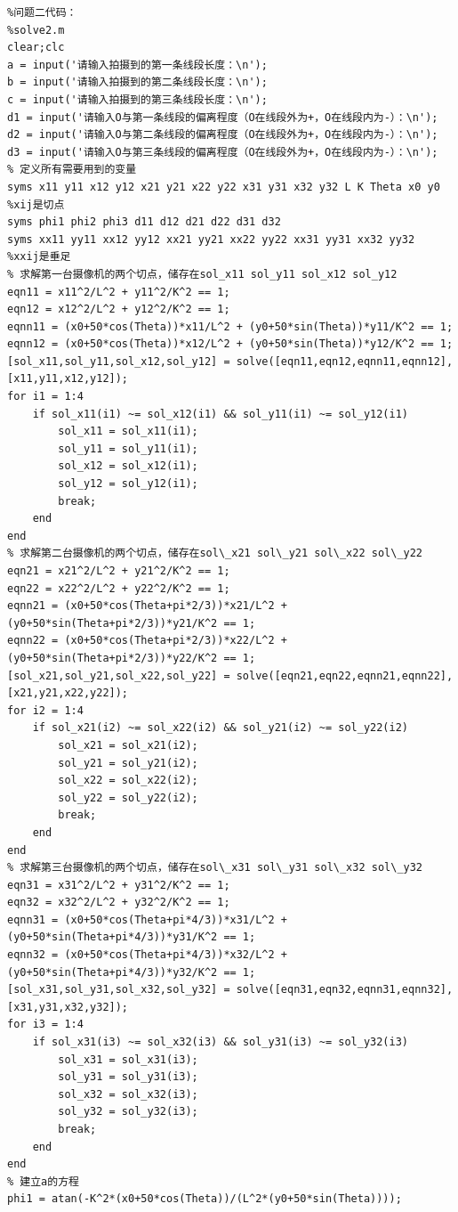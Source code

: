 \documentclass[a4paper,10.5pt]{ctexart}
\begin{document}
\begin{lstlisting}
%问题二代码：
%solve2.m
clear;clc
a = input('请输入拍摄到的第一条线段长度：\n');
b = input('请输入拍摄到的第二条线段长度：\n');
c = input('请输入拍摄到的第三条线段长度：\n');
d1 = input('请输入O与第一条线段的偏离程度（O在线段外为+，O在线段内为-）：\n');
d2 = input('请输入O与第二条线段的偏离程度（O在线段外为+，O在线段内为-）：\n');
d3 = input('请输入O与第三条线段的偏离程度（O在线段外为+，O在线段内为-）：\n');
% 定义所有需要用到的变量
syms x11 y11 x12 y12 x21 y21 x22 y22 x31 y31 x32 y32 L K Theta x0 y0 
%xij是切点
syms phi1 phi2 phi3 d11 d12 d21 d22 d31 d32
syms xx11 yy11 xx12 yy12 xx21 yy21 xx22 yy22 xx31 yy31 xx32 yy32 
%xxij是垂足
% 求解第一台摄像机的两个切点，储存在sol_x11 sol_y11 sol_x12 sol_y12
eqn11 = x11^2/L^2 + y11^2/K^2 == 1;
eqn12 = x12^2/L^2 + y12^2/K^2 == 1;
eqnn11 = (x0+50*cos(Theta))*x11/L^2 + (y0+50*sin(Theta))*y11/K^2 == 1;
eqnn12 = (x0+50*cos(Theta))*x12/L^2 + (y0+50*sin(Theta))*y12/K^2 == 1;
[sol_x11,sol_y11,sol_x12,sol_y12] = solve([eqn11,eqn12,eqnn11,eqnn12],[x11,y11,x12,y12]);
for i1 = 1:4
    if sol_x11(i1) ~= sol_x12(i1) && sol_y11(i1) ~= sol_y12(i1)
        sol_x11 = sol_x11(i1);
        sol_y11 = sol_y11(i1);
        sol_x12 = sol_x12(i1);
        sol_y12 = sol_y12(i1);
        break;
    end
end
% 求解第二台摄像机的两个切点，储存在sol\_x21 sol\_y21 sol\_x22 sol\_y22
eqn21 = x21^2/L^2 + y21^2/K^2 == 1;
eqn22 = x22^2/L^2 + y22^2/K^2 == 1;
eqnn21 = (x0+50*cos(Theta+pi*2/3))*x21/L^2 + (y0+50*sin(Theta+pi*2/3))*y21/K^2 == 1;
eqnn22 = (x0+50*cos(Theta+pi*2/3))*x22/L^2 + (y0+50*sin(Theta+pi*2/3))*y22/K^2 == 1;
[sol_x21,sol_y21,sol_x22,sol_y22] = solve([eqn21,eqn22,eqnn21,eqnn22],[x21,y21,x22,y22]);
for i2 = 1:4
    if sol_x21(i2) ~= sol_x22(i2) && sol_y21(i2) ~= sol_y22(i2)
        sol_x21 = sol_x21(i2);
        sol_y21 = sol_y21(i2);
        sol_x22 = sol_x22(i2);
        sol_y22 = sol_y22(i2);
        break;
    end
end
% 求解第三台摄像机的两个切点，储存在sol\_x31 sol\_y31 sol\_x32 sol\_y32
eqn31 = x31^2/L^2 + y31^2/K^2 == 1;
eqn32 = x32^2/L^2 + y32^2/K^2 == 1;
eqnn31 = (x0+50*cos(Theta+pi*4/3))*x31/L^2 + (y0+50*sin(Theta+pi*4/3))*y31/K^2 == 1;
eqnn32 = (x0+50*cos(Theta+pi*4/3))*x32/L^2 + (y0+50*sin(Theta+pi*4/3))*y32/K^2 == 1;
[sol_x31,sol_y31,sol_x32,sol_y32] = solve([eqn31,eqn32,eqnn31,eqnn32],[x31,y31,x32,y32]);
for i3 = 1:4
    if sol_x31(i3) ~= sol_x32(i3) && sol_y31(i3) ~= sol_y32(i3)
        sol_x31 = sol_x31(i3);
        sol_y31 = sol_y31(i3);
        sol_x32 = sol_x32(i3);
        sol_y32 = sol_y32(i3);
        break;
    end
end
% 建立a的方程
phi1 = atan(-K^2*(x0+50*cos(Theta))/(L^2*(y0+50*sin(Theta))));

\end{lstlisting}
\end{document}
